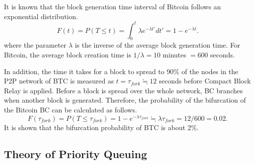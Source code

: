 \documentclass[graybox]{svmult}
\begin{document}
It is known that the block generation time interval of Bitcoin follows an exponential distribution. 
%
\begin{equation}
	F(t) = P(T \le t) = \int_{0}^{t} \lambda e^{-\lambda t'} dt' = 1 - e^{-\lambda t}. \label{eq:exp}
\end{equation}
where the parameter $\lambda$ is the inverse of the average block generation time.
For Bitcoin, the average block creation time is $1 / \lambda = 10$ minutes $= 600$ seconds.


In addition, the time it takes for a block to spread to 90\% of the nodes in the P2P network of BTC is measured as $t = \tau_{fork} \fallingdotseq 12$ seconds before Compact Block Relay is applied. 
Before a block is spread over the whole network, BC branches when another block is generated.
Therefore, the probability of the bifurcation of the Bitcoin BC can be calculated as follows.
%
\begin{equation}
  F(\tau_{fork}) = P(T \le \tau_{fork}) = 1 - e^{-\lambda \tau_{fork}} \fallingdotseq \lambda \tau_{fork} = 12/600 = 0.02. 
\end{equation}
%
It is shown that the bifurcation probability of BTC is about 2\%.



\subsection{Theory of Priority Queuing}
\label{sec:priorityqueue}
\end{document}

